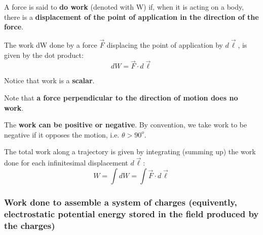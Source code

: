 \documentclass[english,11pt]{article}
\begin{document}
        \begin{itemize}
        {\small
          \item
          A force is said to {\bf do work} (denoted with W) if, when it is acting on a body,
          there is a {\bf displacement of the point of application in the direction of the force}.
          \item
          The work dW done by a force $\vec{F}$ displacing the point of application by $d\vec{\ell}$,
          is given by the dot product:
              \begin{equation*}
                dW = \vec{F} \cdot d\vec{\ell}
              \end{equation*}
          \item
          Notice that work is a {\bf scalar}.
          \item
          Note that {\bf a force perpendicular to the direction of motion does no work}.
          \item
          The {\bf work can be positive or negative}.
          By convention, we take work to be negative if it opposes the motion, i.e. $\theta > 90^{o}$.
          \item
          The total work along a trajectory is given by integrating (summing up) the work done for
          each infinitesimal displacement $d\vec{\ell}$:
             \begin{equation*}
                W = \int dW = \int \vec{F} \cdot d\vec{\ell}
             \end{equation*}
       }
       \end{itemize}

\subsubsection*{\bf Work done to assemble a system of charges
  (equivently, electrostatic potential energy stored in the field produced by the charges)}
\end{document}
